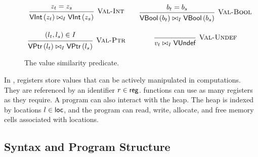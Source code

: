 \documentclass[report.tex]{subfiles}
\begin{document}
\begin{figure}[htp]
  \begin{equation*}
    \begin{array}{c@{\qquad}c}
      \begin{prooftree}
        \hypo{z_t = z_s}
        \infer1[\textsc{Val-Int}]{\sameval{I}{\VInt{z_t}}{\VInt{z_s}}}
      \end{prooftree}
      &
      \begin{prooftree}
        \hypo{b_t = b_s}
        \infer1[\textsc{Val-Bool}]{\sameval{I}{\VBool{b_t}}{\VBool{b_s}}}
      \end{prooftree}
      \\[2em]
      \begin{prooftree}
        \hypo{(l_t, l_s) \in I}
        \infer1[\textsc{Val-Ptr}]{\sameval{I}{\VPtr{l_t}}{\VPtr{l_s}}}
      \end{prooftree}
      &
      \begin{prooftree}
        \hypo{}
        \infer1[\textsc{Val-Undef}]{\sameval{I}{v_t}{\VUndef}}
      \end{prooftree}
    \end{array}
  \end{equation*}
  \caption{The value similarity predicate.}
  \label{fig:same-val}
\end{figure}

In \muRTL{},
registers store values that can be actively manipulated in computations.
They are referenced by an identifier $r \in \textsf{reg}$.
\muRTL{} functions can use as many registers as they require.
A \muRTL{} program can also interact with the heap.
The heap is indexed by locations $l \in \textsf{loc}$,
and the program can read,
write,
allocate,
and free memory cells associated with locations.

\subsection{Syntax and Program Structure}
\end{document}

